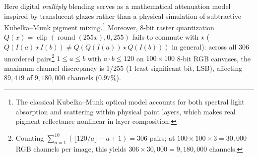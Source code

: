 \documentclass[]{interact}
\theoremstyle{plain}
\theoremstyle{definition}
\theoremstyle{remark}
\begin{document}
Here digital \emph{multiply} blending serves as a mathematical attenuation model inspired by translucent glazes rather than a physical simulation of subtractive Kubelka--Munk pigment mixing.\footnote{The classical Kubelka--Munk optical model \citep{kubelka1931ein} accounts for both spectral light absorption and scattering within physical paint layers, which makes real pigment reflectance nonlinear in layer composition.} Moreover, 8-bit raster quantization $Q(x) = \operatorname{clip}(\operatorname{round}(255x), 0, 255)$ fails to commute with $\star$ ($Q(I(a) \star I(b)) \neq Q(Q(I(a)) \star Q(I(b)))$ in general): across all $306$ unordered pairs\footnote{Counting $\sum_{a=1}^{10} (\lfloor 120/a \rfloor - a + 1) = 306$ pairs; at $100 \times 100 \times 3 = 30{,}000$ RGB channels per image, this yields $306 \times 30{,}000 = 9{,}180{,}000$ channels.} $1 \le a \le b$ with $a \cdot b \le 120$ on $100 \times 100$ 8-bit RGB canvases, the maximum channel discrepancy is $1 / 255$ ($1$ least significant bit, LSB), affecting $89{,}419$ of $9{,}180{,}000$ channels ($0.97\%$).
\end{document}
